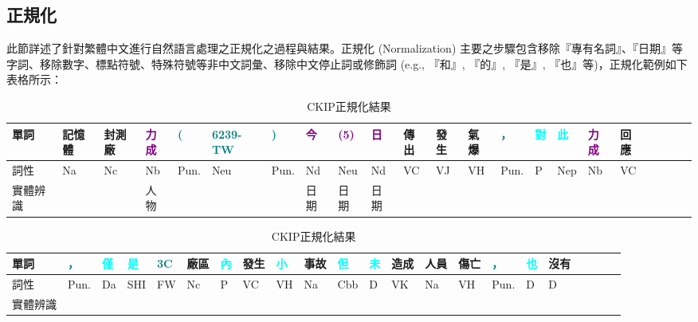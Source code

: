 \subsection{正規化}
此節詳述了針對繁體中文進行自然語言處理之正規化之過程與結果。正規化 (Normalization) 主要之步驟包含移除『專有名詞』、『日期』等字詞、移除數字、標點符號、特殊符號等非中文詞彙、移除中文停止詞或修飾詞  (e.g., 『和』, 『的』, 『是』, 『也』等)，正規化範例如下表格所示：
\begin{table}[H]
\begin{center}
\begin{tabular}[c]{l|m{0.3cm}<{\centering}m{0.3cm}<{\centering}m{0.3cm}<{\centering}m{0.5cm}<{\centering}m{0.5cm}<{\centering}m{0.5cm}<{\centering}m{0.3cm}<{\centering}m{0.5cm}<{\centering}m{0.3cm}<{\centering}m{0.3cm}<{\centering}m{0.3cm}<{\centering}m{0.3cm}<{\centering}m{0.5cm}<{\centering}m{0.3cm}<{\centering}m{0.5cm}<{\centering}m{0.5cm}<{\centering}m{0.2cm}<{\centering}m{0.3cm}<{\centering}m{0.3cm}<{\centering}m{0.3cm}<{\centering}m{0.3cm}<{\centering}}
\toprule
單詞 & 記憶體 & 封測廠 & \textcolor{purple}{力成} & \textcolor{teal}{(} & \textcolor{teal}{6239-TW} & \textcolor{teal}{)} & \textcolor{purple}{今} & \textcolor{purple}{(5)} & \textcolor{purple}{日} & 傳出 & 發生 & 氣爆 & \textcolor{teal}{，} & \textcolor{cyan}{對} & \textcolor{cyan}{此} & \textcolor{purple}{力成} & 回應 \\
\hline
詞性 & Na & Nc & Nb & Pun. & Neu & Pun. & Nd & Neu & Nd & VC &  VJ & VH & Pun. & P & Nep & Nb & VC \\
\hline
實體辨識 &  &  & 人物 &  &  & & 日期 & 日期 & 日期 &  &  &  &  & \\
\bottomrule
\end{tabular}
\end{center}
\caption{CKIP正規化結果}
\label{Tab 4.3}
\end{table}

\begin{table}[H]
\begin{center}
\begin{tabular}[c]{l|m{0.5cm}<{\centering}m{0.3cm}<{\centering}m{0.5cm}<{\centering}m{0.5cm}<{\centering}m{0.3cm}<{\centering}m{0.5cm}<{\centering}m{0.3cm}<{\centering}m{0.5cm}<{\centering}m{0.5cm}<{\centering}m{0.5cm}<{\centering}m{0.3cm}<{\centering}m{0.3cm}<{\centering}m{0.5cm}<{\centering}m{0.3cm}<{\centering}m{0.5cm}<{\centering}m{0.5cm}<{\centering}m{0.2cm}<{\centering}m{0.3cm}<{\centering}m{0.3cm}<{\centering}m{0.3cm}<{\centering}m{0.3cm}<{\centering}}
\toprule
單詞 & \textcolor{teal}{，} & \textcolor{cyan}{僅} & \textcolor{cyan}{是} & \textcolor{teal}{3C} & 廠區 & \textcolor{cyan}{內} & 發生 & \textcolor{cyan}{小} & 事故 & \textcolor{cyan}{但} & \textcolor{cyan}{未} & 造成 & 人員 & 傷亡 & \textcolor{teal}{，} & \textcolor{cyan}{也} & 沒有 \\
\hline
詞性 & Pun. & Da & SHI & FW & Nc & P & VC & VH & Na & Cbb & D & VK & Na & VH & Pun. & D & D \\
\hline
實體辨識 &  &  &  &  &  & &  &  &  &  &  &  &  & \\
\bottomrule
\end{tabular}
\end{center}
\caption{CKIP正規化結果}
\label{Tab 4.4}
\end{table}

